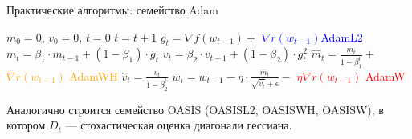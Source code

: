 \documentclass[aspectratio=169, 12pt]{beamer}
\begin{document}
\begin{frame}{Практические алгоритмы: семейство Adam}
    \begin{algorithm}[H]
            \caption{Различные способы добавления регуляризации для Adam}\label{alg:genAdam}
            \begin{algorithmic}
            \footnotesize{
            \State $m_0 = 0$, $v_0 = 0$, $t = 0$
            \State $t = t+1$
            \State $g_t = \nabla f(w_{t-1}) + $ \textcolor{blue}{$\nabla r(w_{t-1})$}\hfill \textcolor{blue}{AdamL2}
            \State $m_t = \beta_1 \cdot m_{t-1} + (1 - \beta_1) \cdot g_t$
            \State $v_t = \beta_2 \cdot v_{t-1} + (1 - \beta_2) \cdot g_t^2$
            \State $\hat{m}_t = \frac{m_t}{1-\beta_1^t} +$ \textcolor{orange}{$\nabla r(w_{t-1})$} \hfill \textcolor{orange}{AdamWH}
            \State $\hat{v}_t = \frac{v_t}{1-\beta_2^t}$
            \State $w_t = w_{t-1} - \eta \cdot \frac{\hat{m}_t}{\sqrt{\hat{v}_t} + \epsilon} - $ \textcolor{red}{$\eta \nabla r(w_{t-1})$ } \hfill \textcolor{red}{AdamW}
            \EndWhile
            }
\end{algorithmic}
\end{algorithm}
\footnotesize{Аналогично строится семейство OASIS (OASISL2, OASISWH, OASISW), в котором $D_t$ --- стохастическая оценка диагонали гессиана.}
\end{frame}
\end{document}
